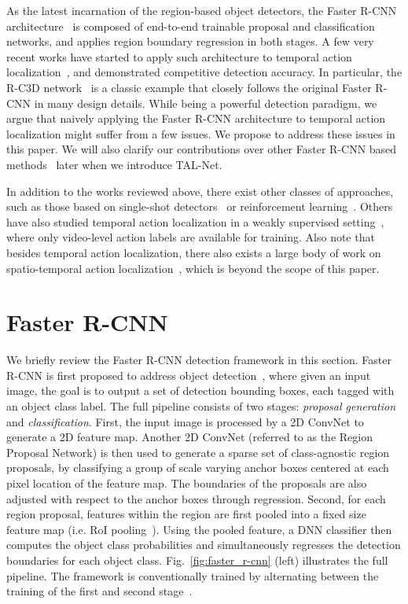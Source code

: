 \documentclass[10pt,twocolumn,letterpaper]{article}
\begin{document}
As the latest incarnation of the region-based object detectors, the Faster
R-CNN architecture~\cite{ren:nips2015} is composed of end-to-end trainable
proposal and classification networks, and applies region boundary regression in
both stages. A few very recent works have started to apply such architecture to
temporal action
localization~\cite{gao:bmvc2017,dai:iccv2017,gao:iccv2017,xu:iccv2017}, and
demonstrated competitive detection accuracy. In particular, the R-C3D
network~\cite{xu:iccv2017} is a classic example that closely follows the
original Faster R-CNN in many design details. While being a powerful detection
paradigm, we argue that naively applying the Faster R-CNN architecture to
temporal action localization might suffer from a few issues. We propose to
address these issues in this paper. We will also clarify our contributions over
other Faster R-CNN based
methods~\cite{gao:bmvc2017,dai:iccv2017,gao:iccv2017,xu:iccv2017} later when we
introduce TAL-Net.

In addition to the works reviewed above, there exist other classes of
approaches, such as those based on single-shot
detectors~\cite{buch:bmvc2017,lin:acmmm2017} or reinforcement
learning~\cite{yeung:cvpr2016}. Others have also studied temporal action
localization in a weakly supervised setting~\cite{sun:acmmm2015,wang:cvpr2017},
where only video-level action labels are available for training. Also note that
besides temporal action localization, there also exists a large body of work on
spatio-temporal action
localization~\cite{gkioxari:cvpr2015,kalogeiton:iccv2017,singh:iccv2017}, which
is beyond the scope of this paper.

\section{Faster R-CNN}

We briefly review the Faster R-CNN detection framework in this section. Faster
R-CNN is first proposed to address object detection~\cite{ren:nips2015}, where
given an input image, the goal is to output a set of detection bounding boxes,
each tagged with an object class label. The full pipeline consists of two
stages: \textit{proposal generation} and \textit{classification}. First, the
input image is processed by a 2D ConvNet to generate a 2D feature map. Another
2D ConvNet (referred to as the Region Proposal Network) is then used to
generate a sparse set of class-agnostic region proposals, by classifying a
group of scale varying anchor boxes centered at each pixel location of the
feature map. The boundaries of the proposals are also adjusted with respect to
the anchor boxes through regression. Second, for each region proposal, features
within the region are first pooled into a fixed size feature map (i.e. RoI
pooling~\cite{girshick:iccv2015}). Using the pooled feature, a DNN classifier
then computes the object class probabilities and simultaneously regresses the
detection boundaries for each object class. Fig.~\ref{fig:faster_r-cnn} (left)
illustrates the full pipeline. The framework is conventionally trained by
alternating between the training of the first and second
stage~\cite{ren:nips2015}.
\end{document}
